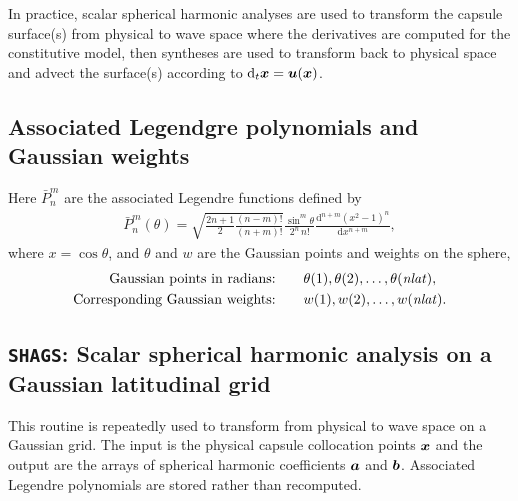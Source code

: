 \documentclass[11pt]{article}
\begin{document}
In practice, scalar spherical harmonic analyses are used to transform the 
capsule surface(s) from physical to wave space where the derivatives are computed
for the constitutive model, then syntheses are used to transform back to physical space and 
advect the surface(s) according to $\text{d}_t \mbox{\boldmath $x$} = \mbox{\boldmath $u$}(\mbox{\boldmath $x$})$. 

\subsection*{Associated Legendgre polynomials and Gaussian weights}

Here $\bar{P}_n^m$ are the associated Legendre functions defined by
\begin{gather}
	\bar{P}_n^m(\theta) = \sqrt{ \frac{2n+1}{2} \frac{ (n-m)! }{ (n+m)! } } \frac{\sin^m \theta }{ 2^n \, n!}
	\frac{ \text{d}^{n+m} (x^2 -1)^n }{\text{d}x^{n+m}} ,
\end{gather}
where $x = \cos \theta$, and $\theta$ and $w$ are the Gaussian points and weights on the sphere,
\begin{align*}
	\text{Gaussian points in radians:} \qquad &\theta(1), \theta(2), \ldots, \theta(\mathit{nlat}), \\
	\text{Corresponding Gaussian weights:} \qquad &w(1), w(2), \ldots, w(\mathit{nlat}).
\end{align*}

\subsection*{\texttt{SHAGS}: Scalar spherical harmonic {\color{red}analysis} on a Gaussian latitudinal grid}

This routine is repeatedly used to transform from physical to wave space on a Gaussian grid.
The input is the physical capsule collocation points $\mbox{\boldmath $x$}$ and the output are the arrays of spherical
harmonic coefficients $\mbox{\boldmath $a$}$ and $\mbox{\boldmath $b$}$. Associated Legendre polynomials are stored rather
than recomputed. \\
\end{document}
